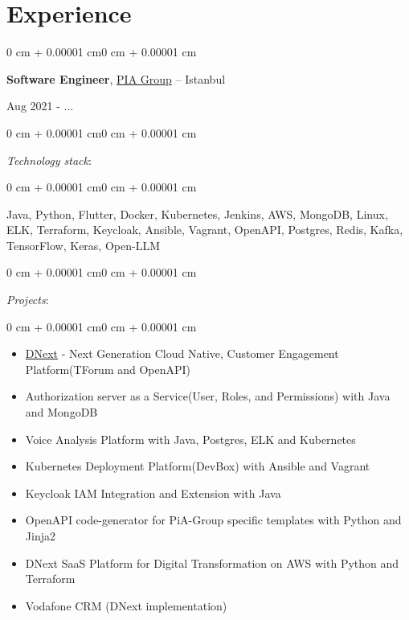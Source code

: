 \documentclass[10pt, letterpaper]{article}
\newenvironment{highlights}{
    \begin{itemize}[
        topsep=0.10 cm,
        parsep=0.10 cm,
        partopsep=0pt,
        itemsep=0pt,
        leftmargin=0 cm + 10pt]
}{
    \end{itemize}} %
\newenvironment{onecolentry}{
    \begin{adjustwidth}{0 cm + 0.00001 cm}{0 cm + 0.00001 cm}
}{
    \end{adjustwidth}}
\newenvironment{twocolentry}[2][]{
    \onecolentry
    \def\secondColumn{#2}
    \setcolumnwidth{\fill, 4.5 cm}
    \begin{paracol}{2}
}{
    \switchcolumn \raggedleft \secondColumn
    \end{paracol}
    \endonecolentry
} %
\begin{document}
    \section{Experience}
        \begin{twocolentry}{Aug 2021 - ...}
            \textbf{Software Engineer}, \href{https://www.pia-group.net/}{PIA Group} -- Istanbul
        \end{twocolentry}
            \begin{onecolentry}
                \textit{Technology stack}:
            \end{onecolentry}
            \begin{onecolentry}
                \begin{highlights}
                    Java, Python, Flutter, Docker, Kubernetes, Jenkins, AWS, MongoDB, Linux, ELK, Terraform, Keycloak, Ansible, Vagrant, OpenAPI, Postgres, Redis, Kafka, TensorFlow, Keras, Open-LLM
                \end{highlights}
            \end{onecolentry}
            \vspace{0.2 cm}
            \begin{onecolentry}
                \textit{Projects}:
            \end{onecolentry}
            \begin{onecolentry}
                \begin{highlights}
                    \item \href{https://www.dnext-technology.com/}{DNext} - Next Generation Cloud Native, Customer Engagement Platform(TForum and OpenAPI)
                    \item Authorization server as a Service(User, Roles, and Permissions) with Java and MongoDB
                    \item Voice Analysis Platform with Java, Postgres, ELK and Kubernetes
                    \item Kubernetes Deployment Platform(DevBox) with Ansible and Vagrant
                    \item Keycloak IAM Integration and Extension with Java
                    \item OpenAPI code-generator for PiA-Group specific templates with Python and Jinja2
                    \item DNext SaaS Platform for Digital Transformation on AWS with Python and Terraform
                    \item Vodafone CRM (DNext implementation)
                \end{highlights}
            \end{onecolentry}
\end{document}
